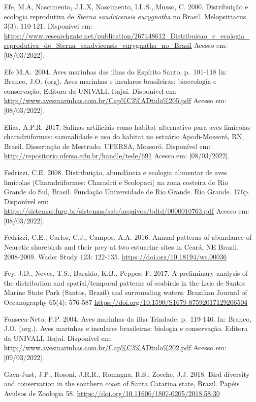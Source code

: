 \documentclass[
  oneside]{scrbook}
\begin{document}
Efe, M.A, Nascimento, J.L.X, Nascimento, I.L.S., Musso, C. 2000. Distribuição e ecologia reprodutiva de \emph{Sterna sandvicensis eurygnatha} no Brasil. Melopsittacus 3(3): 110-121. Disponível em: \url{https://www.researchgate.net/publication/267448612_Distribuicao_e_ecologia_reprodutiva_de_Sterna_sandvicensis_eurygnatha_no_Brasil} Acesso em: {[}08/03/2022{]}.

Efe M.A.~2004. Aves marinhas das ilhas do Espírito Santo, p.~101-118 In: Branco, J.O. (org). Aves marinhas e insulares brasileiras: bioecologia e conservação. Editora da UNIVALI. Itajaí. Disponível em: \url{http://www.avesmarinhas.com.br/Cap\%C3\%ADtulo\%205.pdf} Acesso em: {[}08/03/2022{]}.

Elias, A.P.R. 2017. Salinas artificiais como habitat alternativo para aves limícolas charadriiformes: sazonalidade e uso do habitat no estuário Apodi-Mossoró, RN, Brasil. Dissertação de Mestrado. UFERSA, Mossoró. Disponível em: \url{http://repositorio.ufersa.edu.br/handle/tede/691} Acesso em: {[}08/03/2022{]}.

Fedrizzi, C.E. 2008. Distribuição, abundância e ecologia alimentar de aves limícolas (Charadriiformes: Charadrii e Scolopaci) na zona costeira do Rio Grande do Sul, Brasil. Fundação Universidade de Rio Grande. Rio Grande. 176p. Disponível em: \url{https://sistemas.furg.br/sistemas/sab/arquivos/bdtd/0000010763.pdf} Acesso em: {[}08/03/2022{]}.

Fedrizzi, C.E., Carlos, C.J., Campos, A.A. 2016. Annual patterns of abundance of Nearctic shorebirds and their prey at two estuarine sites in Ceará, NE Brazil, 2008-2009. Wader Study 123: 122-135. \url{https://doi.org/10.18194/ws.00036}

Fey, J.D., Neves, T.S., Baraldo, K.B., Peppes, F. 2017. A preliminary analysis of the distribution and spatial/temporal patterns of seabirds in the Laje de Santos Marine State Park (Santos, Brazil) and surrounding waters. Brazilian Journal of Oceanography 65(4): 576-587 \url{https://doi.org/10.1590/S1679-87592017129206504}

Fonseca-Neto, F.P. 2004. Aves marinhas da ilha Trindade, p.~119-146. In: Branco, J.O. (org.). Aves marinhas e insulares brasileiras: biologia e conservação. Editora da UNIVALI. Itajaí. Disponível em: \url{http://www.avesmarinhas.com.br/Cap\%C3\%ADtulo\%202.pdf} Acesso em: {[}09/03/2022{]}.

Gava-Just, J.P., Rosoni, J.R.R., Romagna, R.S., Zocche, J.J. 2018. Bird diversity and conservation in the southern coast of Santa Catarina state, Brazil. Papéis Avulsos de Zoologia 58. \url{https://doi.org/10.11606/1807-0205/2018.58.30}
\end{document}
